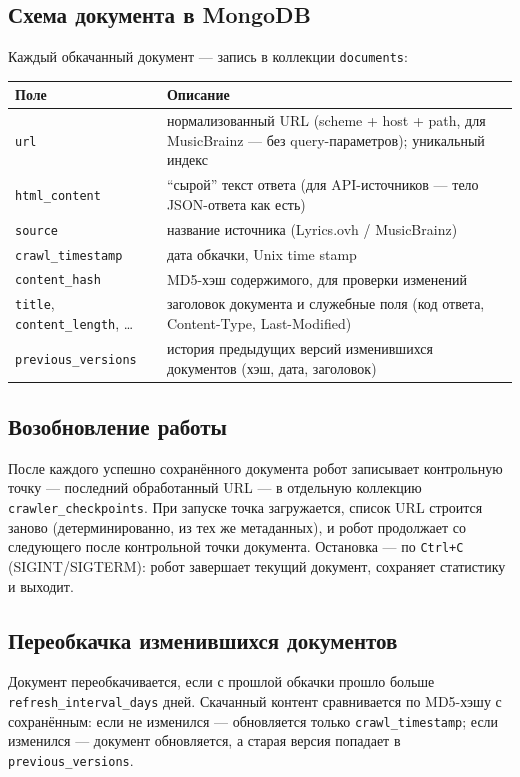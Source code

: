\subsection{Схема документа в MongoDB}
Каждый обкачанный документ --- запись в коллекции \texttt{documents}:

\begin{tabular}{|l|p{10cm}|}
\hline
Поле & Описание \\ \hline
\texttt{url} & нормализованный URL (scheme + host + path, для MusicBrainz ---
без query-параметров); уникальный индекс \\ \hline
\texttt{html\_content} & \enquote{сырой} текст ответа (для API-источников ---
тело JSON-ответа как есть) \\ \hline
\texttt{source} & название источника (Lyrics.ovh / MusicBrainz) \\ \hline
\texttt{crawl\_timestamp} & дата обкачки, Unix time stamp \\ \hline
\texttt{content\_hash} & MD5-хэш содержимого, для проверки изменений \\ \hline
\texttt{title}, \texttt{content\_length}, \ldots & заголовок документа и
служебные поля (код ответа, Content-Type, Last-Modified) \\ \hline
\texttt{previous\_versions} & история предыдущих версий изменившихся
документов (хэш, дата, заголовок) \\ \hline
\end{tabular}

\subsection{Возобновление работы}
После каждого успешно сохранённого документа робот записывает контрольную
точку --- последний обработанный URL --- в отдельную коллекцию
\texttt{crawler\_checkpoints}. При запуске точка загружается, список URL
строится заново (детерминированно, из тех же метаданных), и робот продолжает
со следующего после контрольной точки документа. Остановка --- по
\texttt{Ctrl+C} (SIGINT/SIGTERM): робот завершает текущий документ, сохраняет
статистику и выходит.

\subsection{Переобкачка изменившихся документов}
Документ переобкачивается, если с прошлой обкачки прошло больше
\texttt{refresh\_interval\_days} дней. Скачанный контент сравнивается по
MD5-хэшу с сохранённым: если не изменился --- обновляется только
\texttt{crawl\_timestamp}; если изменился --- документ обновляется, а старая
версия попадает в \texttt{previous\_versions}.


